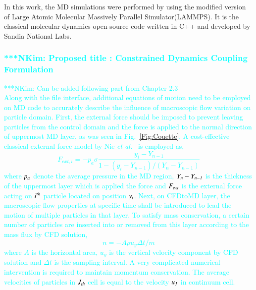 \documentclass[preprint,12pt]{elsarticle}
\newcommand{\Nkimnote}[1]{ {\textcolor{cyan} { ***NKim: #1 }}}
\newcommand{\Nkimnote}[1]{}
\begin{document}
In this work,  the MD simulations were performed by using the modified version of Large Atomic Molecular Massively Parallel Simulator(LAMMPS). It is the classical molecular dynamics open-source code written in C++ and developed by Sandia National Labs.~\cite{LAMMPS}

\subsubsection{
\Nkimnote{Proposed title : Constrained Dynamics Coupling Formulation}
}

\Nkimnote{Can be added following part from Chapter 2.3\\
Along with the file interface, additional equations of motion need to be employed on MD code to accurately describe the influence of macroscopic flow variation on particle domain. First, the external force should be imposed to prevent leaving particles from the control domain and the force is applied to the normal direction of uppermost MD layer, as was seen in Fig.~\ref{Fig:Couette}. A cost-effective classical external force model by Nie {\it{et al.}}~\cite{Nie} is employed as,
\vspace{-.2em}
\begin{equation}
 F_{ext, i} = -p_{a}\sigma\frac{y_{i}-Y_{n-1}}{1-(y_{i}-Y_{n-1})/(Y_{n}-Y_{n-1})}
 \label{eq:External_Force}
\end{equation}
\normalsize
where $\it p_{a}$ denote the average pressure in the MD region, $\it Y_{n}-Y_{n-1}$ is the thickness of the uppermost layer which is applied the force and $\it F_{ext}$ is the external force acting on $\it i^{th}$ particle located on position $\it y_{i}$.
Next, on CFDtoMD layer, the macroscopic flow properties at specific time shall be introduced to lead the motion of multiple particles in that layer. To satisfy mass conservation, a certain number of particles are inserted into or removed from this layer according to the mass flux by CFD solution,
\vspace{-.2em}
\begin{equation}
n = -A \rho u_y \Delta t / m
 \label{eq:Mass_Flux}
\end{equation}
\normalsize
where $A$ is the horizontal area, $u_y$ is the vertical velocity component by CFD solution and $\Delta t$ is the sampling interval.
A very complicated numerical intervention is required to maintain momentum conservation. The average velocities of particles in $\it J_{th}$ cell is equal to the velocity $\it u_{J}$ in continuum cell.
}
\end{document}
